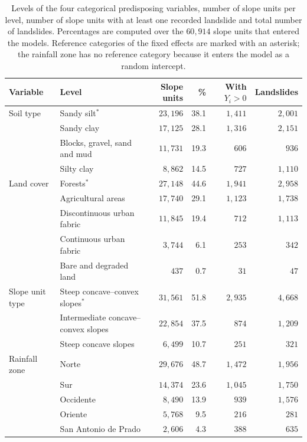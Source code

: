 \renewcommand{\arraystretch}{1.2}
\setlength{\tabcolsep}{5pt}

\begin{table}[ht]
\centering
\footnotesize
\begin{tabularx}{\textwidth}{>{\raggedright\arraybackslash}m{2.4cm} X r r r r}
\hline
\textbf{Variable} & \textbf{Level} & \textbf{Slope units} & \textbf{\%} & \textbf{With $Y_i>0$} & \textbf{Landslides} \\
\hline
Soil type & Sandy silt$^{*}$ & $23{,}196$ & 38.1 & $1{,}411$ & $2{,}001$ \\
 & Sandy clay & $17{,}125$ & 28.1 & $1{,}316$ & $2{,}151$ \\
 & Blocks, gravel, sand and mud & $11{,}731$ & 19.3 & $606$ & $936$ \\
 & Silty clay & $8{,}862$ & 14.5 & $727$ & $1{,}110$ \\
Land cover & Forests$^{*}$ & $27{,}148$ & 44.6 & $1{,}941$ & $2{,}958$ \\
 & Agricultural areas & $17{,}740$ & 29.1 & $1{,}123$ & $1{,}738$ \\
 & Discontinuous urban fabric & $11{,}845$ & 19.4 & $712$ & $1{,}113$ \\
 & Continuous urban fabric & $3{,}744$ & 6.1 & $253$ & $342$ \\
 & Bare and degraded land & $437$ & 0.7 & $31$ & $47$ \\
Slope unit type & Steep concave--convex slopes$^{*}$ & $31{,}561$ & 51.8 & $2{,}935$ & $4{,}668$ \\
 & Intermediate concave--convex slopes & $22{,}854$ & 37.5 & $874$ & $1{,}209$ \\
 & Steep concave slopes & $6{,}499$ & 10.7 & $251$ & $321$ \\
Rainfall zone & Norte & $29{,}676$ & 48.7 & $1{,}472$ & $1{,}956$ \\
 & Sur & $14{,}374$ & 23.6 & $1{,}045$ & $1{,}750$ \\
 & Occidente & $8{,}490$ & 13.9 & $939$ & $1{,}576$ \\
 & Oriente & $5{,}768$ & 9.5 & $216$ & $281$ \\
 & San Antonio de Prado & $2{,}606$ & 4.3 & $388$ & $635$ \\
\hline
\end{tabularx}
\caption{Levels of the four categorical predisposing variables, number of slope units per level, number of slope units with at least one recorded landslide and total number of landslides. Percentages are computed over the $60{,}914$ slope units that entered the models. Reference categories of the fixed effects are marked with an asterisk; the rainfall zone has no reference category because it enters the model as a random intercept.}
\label{tab:th-levels}
\end{table}
